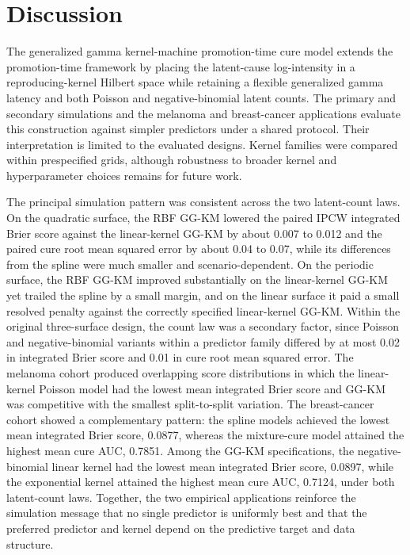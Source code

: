 \section{Discussion}\label{sec:discussion}

The generalized gamma kernel-machine promotion-time cure model extends the promotion-time
framework by placing the latent-cause log-intensity in a reproducing-kernel Hilbert space
while retaining a flexible generalized gamma latency and both Poisson and negative-binomial
latent counts. The primary and secondary simulations and the melanoma and breast-cancer
applications evaluate this construction against simpler predictors under a shared protocol.
Their interpretation is limited to the evaluated designs. Kernel families were compared
within prespecified grids, although robustness to broader kernel and hyperparameter choices
remains for future work.

The principal simulation pattern was consistent across the two latent-count laws. On the
quadratic surface, the RBF GG-KM lowered the paired IPCW integrated Brier score against the
linear-kernel GG-KM by about 0.007 to 0.012 and the paired cure root mean squared error by
about 0.04 to 0.07, while its differences from the spline were much smaller and
scenario-dependent. On the periodic surface, the RBF GG-KM improved substantially on the
linear-kernel GG-KM yet trailed the spline by a small margin, and on the linear surface it
paid a small resolved penalty against the correctly specified linear-kernel GG-KM. Within
the original three-surface design, the count law was a secondary factor, since Poisson and
negative-binomial variants within a predictor family differed by at most 0.02 in integrated
Brier score and 0.01 in cure root mean squared error. The melanoma cohort produced overlapping
score distributions in which the linear-kernel Poisson model had the lowest mean integrated
Brier score and GG-KM was competitive with the smallest split-to-split variation. The
breast-cancer cohort showed a complementary pattern: the spline models achieved the lowest
mean integrated Brier score, 0.0877, whereas the mixture-cure model attained the
highest mean cure AUC, 0.7851. Among the GG-KM specifications, the negative-binomial
linear kernel had the lowest mean integrated Brier score, 0.0897, while the exponential
kernel attained the highest mean cure AUC, 0.7124, under both latent-count laws. Together,
the two empirical applications reinforce the simulation message that no
single predictor is uniformly best and that the preferred predictor and
kernel depend on the predictive target and data structure.

